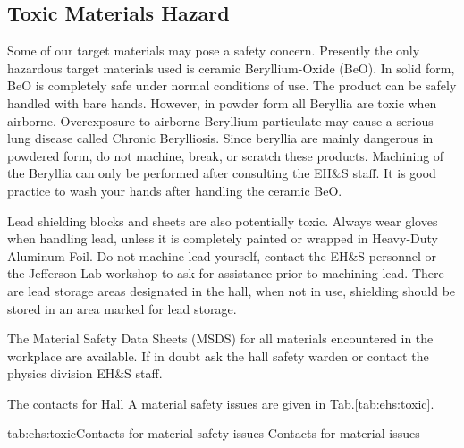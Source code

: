 \begin{safetyen}{0}{0}
\section{Toxic Materials Hazard} 
\label{sec:toxichazard}
\end{safetyen}

 Some of our target materials may pose a safety concern. Presently the
 only hazardous target materials used is ceramic Beryllium-Oxide (BeO).
 In solid form, BeO is completely safe under normal conditions of use.
 The product can be safely handled with bare hands. However, in powder form 
 all Beryllia are toxic when airborne. Overexposure to airborne Beryllium particulate 
 may cause a serious lung disease called Chronic Berylliosis. 
 Since beryllia are mainly dangerous in powdered form, do not machine, break, or 
 scratch these products. Machining of the Beryllia can only be performed after 
 consulting the EH\&S staff. It is good practice to wash your hands after handling 
 the ceramic BeO.

 Lead shielding blocks and sheets are also potentially toxic. Always wear gloves 
 when handling lead, unless it is completely painted or wrapped in Heavy-Duty 
 Aluminum Foil. Do not machine lead yourself, contact the EH\&S personnel or 
 the Jefferson Lab workshop to ask for assistance prior to machining lead. There 
 are lead storage areas designated in the hall, when not in use, shielding should 
 be stored in an area marked for lead storage.

 The Material Safety Data Sheets (MSDS) for all materials encountered in the workplace 
 are available. If in doubt ask the hall safety warden or contact the physics division 
 EH\&S staff.

 The contacts for Hall A material safety issues are given in Tab.\ref{tab:ehs:toxic}.
 
 \begin{namestab}{tab:ehs:toxic}{Contacts for material safety issues}{%
   Contacts for material issues}
 \end{namestab}

\obsolete{
} 

